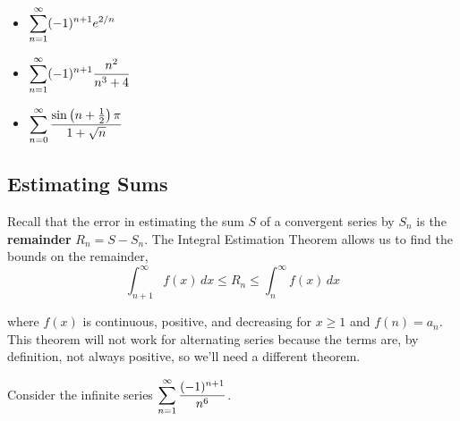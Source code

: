 \documentclass[12pt]{article}
\begin{document}
\vfill

\newpage

\ExamplesCont

\begin{itemize}
\item[\tc{2}] $\displaystyle\sum_{n=1}^\infty(-1)^{n+1}e^{2/n}$

\vfill

\item[\tc{3}] $\displaystyle\sum_{n=1}^\infty (-1)^{n+1}\dfrac{n^2}{n^3+4}$

\vfill

\end{itemize}

\newpage

\ExamplesCont

\begin{itemize}
\item[\tc{4}] $\displaystyle\sum_{n=0}^\infty \dfrac{\sin\left(n+\frac{1}{2}\right)\pi}{1+\sqrt{n}}$
\end{itemize}

\vfill

\subsection*{Estimating Sums}

Recall that the error in estimating the sum $S$ of a convergent series by $S_n$ is the \textbf{remainder} $R_n=S-S_n$. The Integral Estimation Theorem allows us to find the bounds on the remainder,
$$\int_{n+1}^\infty f(x)\,dx\leq R_n\leq \int_n^\infty f(x)\,dx$$

where $f(x)$ is continuous, positive, and decreasing for $x\geq 1$ and $f(n)=a_n$. This theorem will not work for alternating series because the terms are, by definition, not always positive, so we'll need a different theorem.

\vspace{4mm}


\vspace{30mm}

\newpage

\Example Consider the infinite series $\displaystyle\sum_{n=1}^\infty\dfrac{(-1)^{n+1}}{n^6}$.
\end{document}
